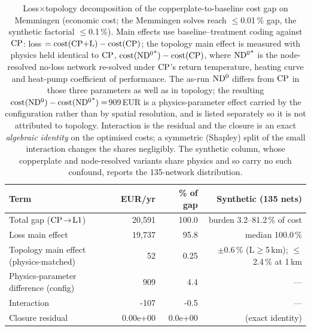 \begin{table}[t]
\centering
\caption{Loss$\times$topology decomposition of the copperplate-to-baseline cost gap on Memmingen
(economic cost; the Memmingen solves reach $\le$0.01\,\% gap, the synthetic factorial $\le$0.1\,\%). Main effects use baseline--treatment coding
against $\mathrm{CP}$: loss $=\text{cost}(\mathrm{CP{+}L})-\text{cost}(\mathrm{CP})$; the topology main effect is measured
with physics held identical to $\mathrm{CP}$, $\text{cost}(\mathrm{ND^{0}}^{\ast})-\text{cost}(\mathrm{CP})$, where
$\mathrm{ND^{0}}^{\ast}$ is the node-resolved no-loss network re-solved under $\mathrm{CP}$'s return temperature,
heating curve and heat-pump coefficient of performance. The as-run $\mathrm{ND^{0}}$ differs from $\mathrm{CP}$ in
those three parameters as well as in topology; the resulting
$\text{cost}(\mathrm{ND^{0}})-\text{cost}(\mathrm{ND^{0}}^{\ast})=$909\,EUR is a physics-parameter effect carried by the
configuration rather than by spatial resolution, and is listed separately so it is not attributed
to topology. Interaction is the residual and the closure is an exact \emph{algebraic identity} on
the optimised costs; a symmetric (Shapley) split of the small interaction changes the shares
negligibly. The synthetic column, whose copperplate and node-resolved variants share physics and
so carry no such confound, reports the 135-network distribution.}
\label{tab:decomposition}
\begin{tabular}{lrrr}
\hline
Term & EUR/yr & \% of gap & Synthetic (135 nets) \\
\hline
Total gap ($\mathrm{CP}\!\to\!\mathrm{L1}$) & 20,591 & 100.0 & burden 3.2--81.2\,\% of cost \\
Loss main effect & 19,737 & 95.8 & median 100.0\,\% \\
Topology main effect (physics-matched) & 52 & 0.25 & $\pm$0.6\,\% (L$\geq$5\,km); $\leq$2.4\,\% at 1\,km \\
Physics-parameter difference (config) & 909 & 4.4 & --- \\
Interaction & -107 & -0.5 & --- \\
\hline
Closure residual & 0.00e+00 & 0.0e+00 & (exact identity) \\
\hline
\end{tabular}
\end{table}
